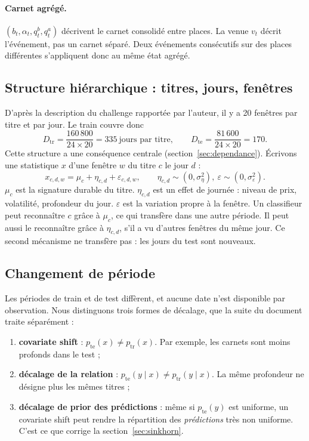 \paragraph{Carnet agrégé.} $(b_t,\alpha_t,q^b_t,q^a_t)$ décrivent le carnet consolidé entre places. La venue $v_t$ décrit l'événement, pas un carnet séparé. Deux événements consécutifs sur des places différentes s'appliquent donc au même état agrégé.

\subsection{Structure hiérarchique : titres, jours, fenêtres}\label{sec:hierarchie}
D'après la description du challenge rapportée par l'auteur, il y a 20 fenêtres par titre et par jour. Le train couvre donc
\[
D_{\text{tr}}=\frac{160\,800}{24\times 20}=335\ \text{jours par titre},\qquad D_{\text{te}}=\frac{81\,600}{24\times 20}=170 .
\]
Cette structure a une conséquence centrale (section~\ref{sec:dependance}). Écrivons une statistique $x$ d'une fenêtre $w$ du titre $c$ le jour $d$ :
\begin{equation}
x_{c,d,w}=\mu_c+\eta_{c,d}+\varepsilon_{c,d,w},\qquad \eta_{c,d}\sim(0,\sigma^2_\eta),\ \varepsilon\sim(0,\sigma^2_\varepsilon).
\label{eq:hier}
\end{equation}
$\mu_c$ est la signature durable du titre. $\eta_{c,d}$ est un effet de journée : niveau de prix, volatilité, profondeur du jour. $\varepsilon$ est la variation propre à la fenêtre. Un classifieur peut reconnaître $c$ grâce à $\mu_c$, ce qui transfère dans une autre période. Il peut aussi le reconnaître grâce à $\eta_{c,d}$, s'il a vu d'autres fenêtres du même jour. Ce second mécanisme ne transfère pas : les jours du test sont nouveaux.

\subsection{Changement de période}
Les périodes de train et de test diffèrent, et aucune date n'est disponible par observation. Nous distinguons trois formes de décalage, que la suite du document traite séparément :
\begin{enumerate}
\item \textbf{covariate shift} : $p_{\text{te}}(x)\neq p_{\text{tr}}(x)$. Par exemple, les carnets sont moins profonds dans le test ;
\item \textbf{décalage de la relation} : $p_{\text{te}}(y\mid x)\neq p_{\text{tr}}(y\mid x)$. La même profondeur ne désigne plus les mêmes titres ;
\item \textbf{décalage de prior des prédictions} : même si $p_{\text{te}}(y)$ est uniforme, un covariate shift peut rendre la répartition des \emph{prédictions} très non uniforme. C'est ce que corrige la section~\ref{sec:sinkhorn}.
\end{enumerate}
